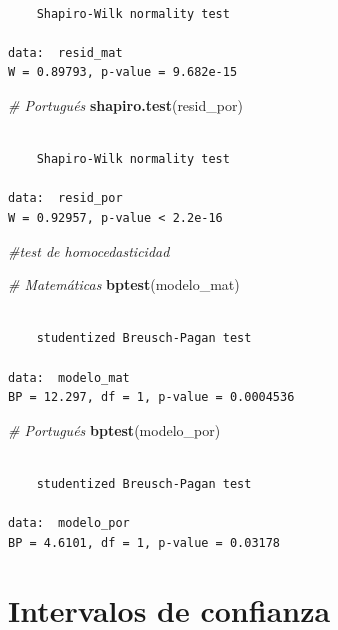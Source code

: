 \documentclass[
]{article}
\newenvironment{Shaded}{\begin{snugshade}}{\end{snugshade}}
\newcommand{\CommentTok}[1]{\textcolor[rgb]{0.56,0.35,0.01}{\textit{#1}}}
\newcommand{\FunctionTok}[1]{\textcolor[rgb]{0.13,0.29,0.53}{\textbf{#1}}}
\newcommand{\NormalTok}[1]{#1}
\begin{document}
\begin{verbatim}

    Shapiro-Wilk normality test

data:  resid_mat
W = 0.89793, p-value = 9.682e-15
\end{verbatim}

\begin{Shaded}
\begin{Highlighting}[]
  \CommentTok{\# Portugués}
\FunctionTok{shapiro.test}\NormalTok{(resid\_por)}
\end{Highlighting}
\end{Shaded}

\begin{verbatim}

    Shapiro-Wilk normality test

data:  resid_por
W = 0.92957, p-value < 2.2e-16
\end{verbatim}

\begin{Shaded}
\begin{Highlighting}[]
\CommentTok{\#test de homocedasticidad}

\CommentTok{\# Matemáticas}
\FunctionTok{bptest}\NormalTok{(modelo\_mat)}
\end{Highlighting}
\end{Shaded}

\begin{verbatim}

    studentized Breusch-Pagan test

data:  modelo_mat
BP = 12.297, df = 1, p-value = 0.0004536
\end{verbatim}

\begin{Shaded}
\begin{Highlighting}[]
  \CommentTok{\# Portugués}
\FunctionTok{bptest}\NormalTok{(modelo\_por)}
\end{Highlighting}
\end{Shaded}

\begin{verbatim}

    studentized Breusch-Pagan test

data:  modelo_por
BP = 4.6101, df = 1, p-value = 0.03178
\end{verbatim}

\section{Intervalos de confianza}\label{intervalos-de-confianza}
\end{document}
